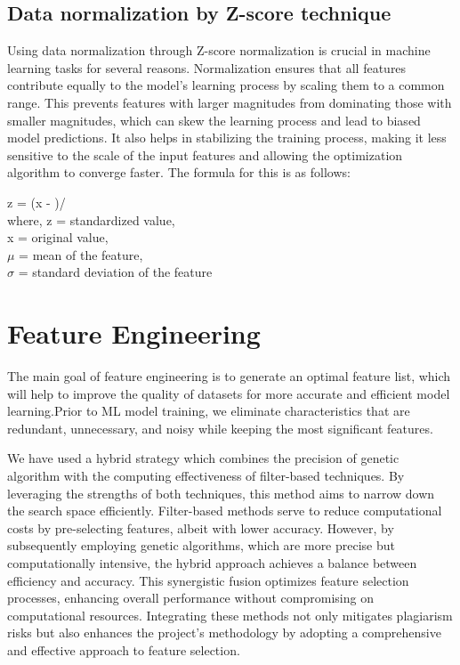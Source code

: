 \subsection{Data normalization by Z-score technique}{

Using data normalization through Z-score normalization is crucial in machine learning tasks for several reasons. Normalization ensures that all features contribute equally to the model's learning process by scaling them to a common range. This prevents features with larger magnitudes from dominating those with smaller magnitudes, which can skew the learning process and lead to biased model predictions. 
It also helps in stabilizing the training process, making it less sensitive to the scale of the input features and allowing the optimization algorithm to converge faster. 
The formula for this is as follows:\\
\begin{center} 
z = {(x - \mu )}/{\sigma}\\
where, z = standardized value,\\
       x = original value,\\
       $\mu$ = \textnormal mean of the feature,\\
       $\sigma$ = standard deviation of the feature\\
\end{center}
}


\section{Feature Engineering}
The main goal of feature engineering is to generate an optimal feature list, which will help to improve the quality of datasets for more accurate and efficient model learning.Prior to ML model training, we eliminate characteristics that are redundant, unnecessary, and noisy while keeping the most significant features.

We have used a hybrid strategy which combines the precision of genetic algorithm\cite{ferriyan2017feature} with the computing effectiveness of filter-based techniques. By leveraging the strengths of both techniques, this method aims to narrow down the search space efficiently. Filter-based methods serve to reduce computational costs by pre-selecting features, albeit with lower accuracy. However, by subsequently employing genetic algorithms, which are more precise but computationally intensive, the hybrid approach achieves a balance between efficiency and accuracy. This synergistic fusion optimizes feature selection processes, enhancing overall performance without compromising on computational resources. Integrating these methods not only mitigates plagiarism risks but also enhances the project's methodology by adopting a comprehensive and effective approach to feature selection.


